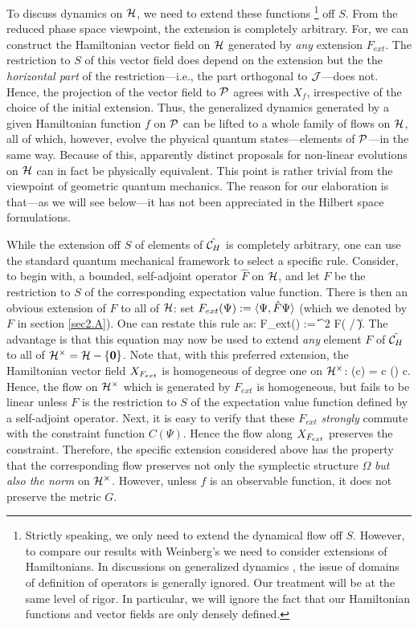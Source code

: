 To discuss dynamics on $\H$, we need to extend these functions%
%
\footnote{Strictly speaking, we only need to extend the dynamical flow
off $S$. However, to compare our results with Weinberg's \cite{weinberg}
we need to consider extensions of Hamiltonians. In discussions on
generalized dynamics \cite{weinberg,birula}, the issue of domains of
definition of operators is generally ignored. Our treatment will be at
the same level of rigor. In particular, we will ignore the fact that
our Hamiltonian functions and vector fields are only densely
defined.}
%
off $S$. {}From the reduced phase space viewpoint, the extension is
completely arbitrary. For, we can construct the Hamiltonian vector
field on $\H$ generated by {\it any} extension $F_{ext}$.  The
restriction to $S$ of this vector field does depend on the extension
but the the {\it horizontal part} of the restriction---i.e., the part
orthogonal to $\J$---does not. Hence, the projection of the vector
field to $\P$ agrees with $X_f$, irrespective of the choice of the
initial extension. Thus, the generalized dynamics generated by a given
Hamiltonian function $f$ on $\P$ can be lifted to a whole family of
flows on $\H$, all of which, however, evolve the physical quantum
states---elements of $\P$---in the same way. Because of this,
apparently distinct proposals for non-linear evolutions on $\H$ can in
fact be physically equivalent. This point is rather trivial from the
viewpoint of geometric quantum mechanics. The reason for our
elaboration is that---as we will see below---it has not been
appreciated in the Hilbert space formulations.

While the extension off $S$ of elements of $\tilde\ch$ is completely
arbitrary, one can use the standard quantum mechanical framework to
select a specific rule. Consider, to begin with, a bounded,
self-adjoint operator $\hat{F}$ on $\H$, and let $F$ be the
restriction to $S$ of the corresponding expectation value function.
There is then an obvious extension of $F$ to all of $\H$: set
$F_{ext}(\Psi) := \<\Psi, \hat{F}\Psi\>$ (which we denoted by $F$ in
section \ref{sec2.A}). One can restate this rule as:
%
\be\label{f_ext} 
F_{ext}(\Psi) := \|\Psi\|^2 F( \Psi / \|\Psi\| ).  
\ee
%
The advantage is that this equation may now be used to extend {\em
any} element $F$ of $\tilde\ch$ to all of $\punctH = \H-\{{\mathbf
0}\}$. Note that, with this preferred extension, the Hamiltonian
vector field $\hvf{F_{ext}}$ is homogeneous of degree one on
$\punctH$:
%
\be \label{hom}
(c\Psi) = c (\Psi) \quad \forall c\in \C.  
\ee 
%
Hence, the flow on $\punctH$ which is generated by $F_{ext}$ is
homogeneous, but fails to be linear unless $F$ is the restriction to
$S$ of the expectation value function defined by a self-adjoint
operator.  Next, it is easy to verify that these $F_{ext}$ {\em
strongly} commute with the constraint function $C(\Psi)$.  Hence the
flow along $\hvf{F_{ext}}$ preserves the constraint.  Therefore, the
specific extension considered above has the property that the
corresponding flow preserves not only the symplectic structure
$\Omega$ {\it but also the norm} on $\punctH$. However, unless $f$ is
an observable function, it does not preserve the metric $G$.

